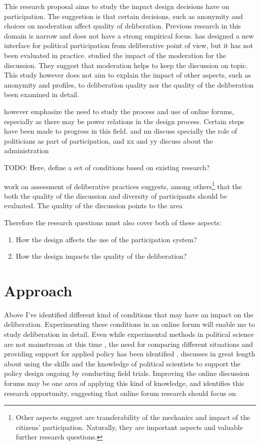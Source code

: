 \documentclass[journal,a4paper]{IEEEtran}
\begin{document}
This research proposal aims to study the impact design decisions have on participation. The suggestion is that certain decisions, such as anonymity and choices on moderation affect quality of deliberation. Previous research in this domain is narrow and does not have a strong empirical focus.  has designed a new interface for political participation from deliberative point of view, but it has not been evaluated in practice.  studied the impact of the moderation for the discussion. They suggest that moderation helps to keep the discussion on topic. This study however does not aim to explain the impact of other aspects, such as anonymity and profiles, to deliberation quality nor the quality of the deliberation been examined in detail.

 however emphasize the need to study the process and use of online forums, especially as there may be power relations in the design process. Certain steps have been made to progress in this field.  and nn discuss specially the role of politicians as part of participation, and xx and yy discuss about the administration

TODO: Here, define a set of conditions based on existing research?

 work on assessment of deliberative practices suggests, among others\footnote{Other aspects  suggest are transferability of the mechanics and impact of the citizens' participation. Naturally, they are important aspects and valuable further research questions.} that the both the quality of the discussion and diversity of participants should be evaluated. The quality of the discussion points to the area

Therefore the research questions must also cover both of these aspects:

\begin{enumerate}
\item How the design affects the use of the participation system?
\item How the design impacts the quality of the deliberation?
\end{enumerate}

\section{Approach}

Above I've identified different kind of conditions that may have an impact on the deliberation. Experimenting these conditions in an online forum will enable me to study deliberation in detail. Even while experimental methods in political science are not mainstream at this time \cite{green03,druckman06}, the need for comparing different situations and providing support for applied policy has been identified \cite{stoker10}.  discusses in great length about using the skills and the knowledge of political scientists to support the policy design ongoing by conducting field trials. Improving the online discussion forums may be one area of applying this kind of knowledge, and  identifies this research opportunity, suggesting that online forum research should focus on
\end{document}
